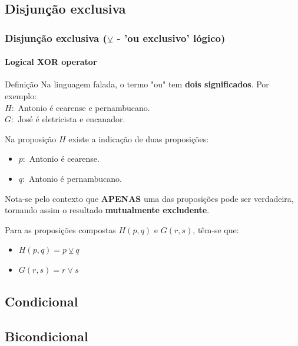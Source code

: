 \documentclass[10pt, headsepline, captions=tableabove,xcolor=table]{beamer}
\begin{document}
\subsection{Disjunção exclusiva}
%
\begin{frame}[t]
    \frametitle{Disjunção exclusiva ($\veebar$ - 'ou exclusivo' lógico)}
    \framesubtitle{Logical XOR operator}
    \begin{block}{Definição}
        Na linguagem falada, o termo "ou" tem \textbf{dois significados}. Por exemplo:\\ [2pt]
        $H:$ Antonio é cearense e pernambucano. \\[2pt]
        $G:$ José é eletricista e encanador.
    \end{block}
    \vspace{-2mm}
    \begin{block}{}
        Na proposição $H$ existe a indicação de duas proposições:
        \begin{itemize}
            \item $p:$ Antonio é cearense.
            \item $q:$ Antonio é pernambucano.
        \end{itemize}
        Nota-se pelo contexto que \textbf{APENAS} uma das proposições pode ser verdadeira, tornando assim o resultado \textbf{mutualmente excludente}.
    \end{block}
    \vspace{-2mm}
    \begin{block}{}
        Para as proposições compostas $H(p,q)$ e $G(r,s)$, têm-se que:
        \begin{itemize}
            \item $H(p,q) = p \veebar q$
            \item $G(r,s) = r \lor s$
        \end{itemize}
    \end{block}
\end{frame}

\subsection{Condicional}
%
\subsection{Bicondicional}
%
\end{document}
